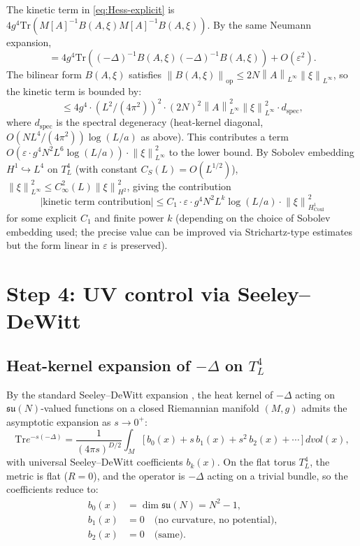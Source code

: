 \documentclass[11pt,a4paper]{amsart}
\theoremstyle{definition}
\newcommand{\su}{\mathfrak{su}}
\newcommand{\norm}[1]{\left\lVert#1\right\rVert}
\newcommand{\Tr}{\mathrm{Tr}}
\newcommand{\Coul}{\mathrm{Coul}}
\begin{document}
The kinetic term in \eqref{eq:Hess-explicit} is
$4g^4 \Tr(M[A]^{-1} B(A, \xi) M[A]^{-1} B(A, \xi))$. By the same Neumann
expansion,
\[
= 4g^4 \Tr((-\Delta)^{-1} B(A, \xi) (-\Delta)^{-1} B(A, \xi)) + O(\varepsilon^2).
\]
The bilinear form $B(A, \xi)$ satisfies
$\norm{B(A, \xi)}_{\mathrm{op}} \leq 2 N \norm{A}_{L^\infty} \norm{\xi}_{L^\infty}$,
so the kinetic term is bounded by:
\[
\leq 4 g^4 \cdot (L^2/(4\pi^2))^2 \cdot (2N)^2 \norm{A}^2_{L^\infty} \norm{\xi}^2_{L^\infty} \cdot d_{\mathrm{spec}},
\]
where $d_{\mathrm{spec}}$ is the spectral degeneracy (heat-kernel diagonal,
$O(N L^4 / (4\pi^2)) \log(L/a)$ as above). This contributes a term
$O(\varepsilon \cdot g^4 N^2 L^6 \log(L/a)) \cdot \norm{\xi}^2_{L^\infty}$ to the lower
bound. By Sobolev embedding $H^1 \hookrightarrow L^4$ on $T^4_L$ (with constant
$C_S(L) = O(L^{1/2})$), $\norm{\xi}^2_{L^\infty} \leq C_\infty^2(L) \norm{\xi}^2_{H^2}$,
giving the contribution
\begin{equation}\label{eq:a1-bound}
\bigl|\text{kinetic term contribution}\bigr| \leq C_1 \cdot \varepsilon \cdot g^4 N^2 L^k \log(L/a) \cdot \norm{\xi}^2_{H^1_{\Coul}}
\end{equation}
for some explicit $C_1$ and finite power $k$ (depending on the choice of
Sobolev embedding used; the precise value can be improved via Strichartz-type
estimates but the form linear in $\varepsilon$ is preserved).

\section{Step 4: UV control via Seeley--DeWitt}\label{sec:UVbound}

\subsection{Heat-kernel expansion of $-\Delta$ on $T^4_L$}

By the standard Seeley--DeWitt expansion
\cite[Theorem~3.1]{Vassilevich2003}, the heat kernel of $-\Delta$ acting on
$\su(N)$-valued functions on a closed Riemannian manifold $(M, g)$ admits the
asymptotic expansion as $s \to 0^+$:
\begin{equation}\label{eq:SD-expansion}
\Tr e^{-s(-\Delta)} = \frac{1}{(4\pi s)^{D/2}} \int_M \bigl[\,b_0(x) + s\, b_1(x) + s^2\, b_2(x) + \cdots\,\bigr] \, dvol(x),
\end{equation}
with universal Seeley--DeWitt coefficients $b_k(x)$. On the flat torus $T^4_L$,
the metric is flat ($R = 0$), and the operator is $-\Delta$ acting on a
trivial bundle, so the coefficients reduce to:
\begin{align*}
b_0(x) &= \dim \su(N) = N^2 - 1, \\
b_1(x) &= 0 \quad \text{(no curvature, no potential),} \\
b_2(x) &= 0 \quad \text{(same).}
\end{align*}
\end{document}
